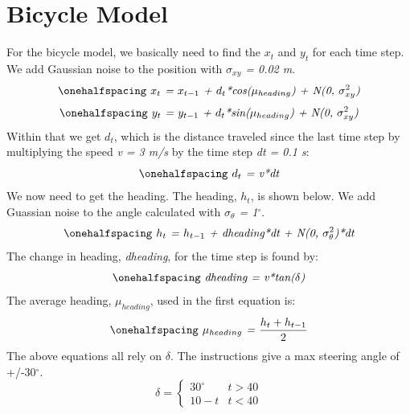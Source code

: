 \documentclass[12pt]{article}
\begin{document}


\newpage
\singlespacing
{}
\section{Bicycle Model}
\setlength{\parindent}{1cm}

For the bicycle model, we basically need to find the \textit{$x_t$} and \textit{$y_t$} for each time step. We add Gaussian noise to the position with \textit{$\sigma_{xy}$ = 0.02 m}.
\begin{equation}
\onehalfspacing
\centering
\emph{ $x_t$ = $x_{t-1}$ + $d_t$*cos($\mu_{heading}$) + N(0, $\sigma_{xy}^2$)}
\end{equation}
\begin{equation}
\onehalfspacing
\centering
\emph{ $y_t$ = $y_{t-1}$ + $d_t$*sin($\mu_{heading}$) + N(0, $\sigma_{xy}^2$)}
\end{equation}
 Within that we get \textit{$d_t$}, which is the distance traveled since the last time step by multiplying the speed \textit{v = 3 m/s} by the time step  \textit{dt = 0.1 s}: 
\begin{equation}
\onehalfspacing
\centering
\emph{ $d_t$ =  v*dt}
\end{equation}
We now need to get the heading. The heading, \textit{$h_t$}, is shown below. We add Guassian noise to the angle calculated with \textit{$\sigma_\theta$ = 1$^\circ$}.
\begin{equation}
\onehalfspacing
\centering
\emph{ $h_t$ = $h_{t-1}$ + dheading*dt + N(0, $\sigma_\theta^2$)*dt}
\end{equation}
The change in heading, \textit{dheading}, for the time step is found by:
\begin{equation}
\onehalfspacing
\centering
\emph{ dheading = v*tan($\delta$)}
\end{equation}
The average heading, \textit{$\mu_{heading}$}, used in the first equation is: 
\begin{equation}
\onehalfspacing
\centering
\emph{ $\mu_{heading}$ = $\frac{h_t + h_{t-1}}{2}$}
\end{equation}
The above equations all rely on \textit{$\delta$}. The instructions give a max steering angle of +/-30$^\circ$.
\[ 
      \delta = 
      \begin{cases} 
      30^\circ & t > 40\\
      10 - t & t < 40
   \end{cases}
\]
\end{document}
